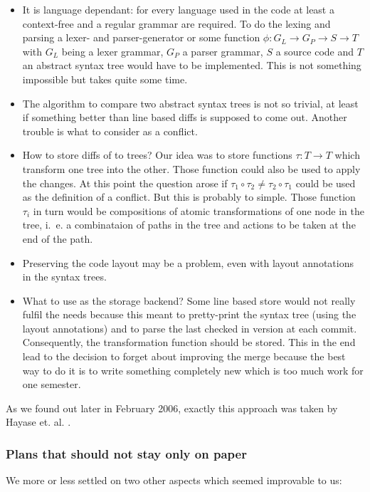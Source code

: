 \documentclass[fleqn, 10pt, a4paper]{report} \usepackage{amssymb}
\begin{document}
\begin{itemize}
\item It is language dependant: for every language used in the code at
  least a context-free and a regular grammar are required. To do the
  lexing and parsing a lexer- and parser-generator or some function
  $\phi : G_L \rightarrow G_P \rightarrow S \rightarrow T$ with $G_L$
  being a lexer grammar, $G_P$ a parser grammar, $S$ a source code and
  $T$ an abstract syntax tree would have to be implemented. This is
  not something impossible but takes quite some time.
\item The algorithm to compare two abstract syntax trees is not so
  trivial, at least if something better than line based diffs is
  supposed to come out. Another trouble is what to consider as a
  conflict.
\item How to store diffs of to trees? Our idea was to store functions
  $\tau : T \rightarrow T$ which transform one tree into the other.
  Those function could also be used to apply the changes. At this
  point the question arose if $\tau_1 \circ \tau_2 \neq \tau_2 \circ
  \tau_1$ could be used as the definition of a conflict. But this is
  probably to simple.  Those function $\tau_i$ in turn would be
  compositions of atomic transformations of one node in the tree,
  i.~e. a combinataion of paths in the tree and actions to be taken at
  the end of the path.
\item Preserving the code layout may be a problem, even with layout
  annotations in the syntax trees.
\item What to use as the storage backend? Some line based store would
  not really fulfil the needs because this meant to pretty-print the
  syntax tree (using the layout annotations) and to parse the last
  checked in version at each commit. Consequently, the transformation
  function should be stored. This in the end lead to the decision to
  forget about improving the merge because the best way to do it is to
  write something completely new which is too much work for one
  semester.
\end{itemize}

As we found out later in February 2006, exactly this approach was
taken by Hayase et. al. \cite{HMI05}.

\subsubsection{Plans that should not stay only on paper}

We more or less settled on two other aspects which seemed improvable
to us:
\end{document}
